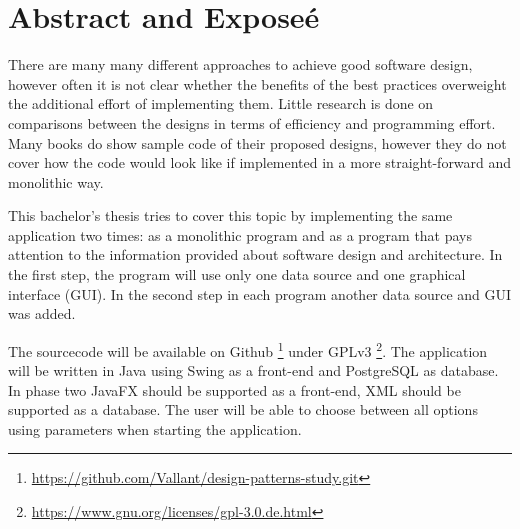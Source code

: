 \chapter{Abstract and Exposeé}

 There are many many different approaches to achieve good software design, however often it is not clear whether the benefits of the best practices overweight the additional effort of implementing them. Little research is done on comparisons between the designs in terms of efficiency and programming effort. Many books do show sample code of their proposed designs, however they do not cover how the code would look like if implemented in a more straight-forward and monolithic way.

This bachelor's thesis tries to cover this topic by implementing the same application two times: as a monolithic program and as a program that pays attention to the information provided about software design and architecture. In the first step, the program will use only one data source and one graphical interface (GUI). In the second step in each program another data source and GUI was added. 

The sourcecode will be available on Github \footnote{\href{https://github.com/Vallant/design-patterns-study.git}{https://github.com/Vallant/design-patterns-study.git}} under GPLv3 \footnote{\href{https://www.gnu.org/licenses/gpl-3.0.de.html}{https://www.gnu.org/licenses/gpl-3.0.de.html}}. The application will be written in Java using Swing as a front-end and PostgreSQL as database. In phase two JavaFX should be supported as a front-end, XML should be supported as a database. The user will be able to choose between all options using parameters when starting the application.
